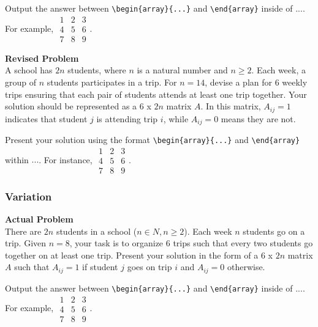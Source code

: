 Output the answer between \verb|\begin{array}{...}| and \verb|\end{array}| inside of $\boxed{...}$. For example, $\boxed{\begin{array}{ccc}1 & 2 & 3 \\ 4 & 5 & 6 \\ 7 & 8 & 9\end{array}}$.

\textbf{Revised Problem}\\
A school has $2n$ students, where $n$ is a natural number and $n \geq 2$. Each week, a group of $n$ students participates in a trip. For $n = 14$, devise a plan for 6 weekly trips ensuring that each pair of students attends at least one trip together. Your solution should be represented as a 6 x $2n$ matrix $A$. In this matrix, $A_{ij} = 1$ indicates that student $j$ is attending trip $i$, while $A_{ij} = 0$ means they are not.

Present your solution using the format \verb|\begin{array}{...}| and \verb|\end{array}| within $\boxed{...}$. For instance, $\boxed{\begin{array}{ccc}1 & 2 & 3 \\ 4 & 5 & 6 \\ 7 & 8 & 9\end{array}}$.

\subsubsection{Variation}
\textbf{Actual Problem}\\
There are $2n$ students in a school ($n \in N, n \geq 2$). Each week $n$ students go on a trip.
Given $n = 8$, your task is to organize 6 trips such that every two students go together on at least one trip. Present your solution 
in the form of a 6 x $2n$ matrix $A$ such that $A_{ij} = 1$ if student $j$ goes on trip $i$ and $A_{ij} = 0$ otherwise.

Output the answer between \verb|\begin{array}{...}| and \verb|\end{array}| inside of $\boxed{...}$. For example, $\boxed{\begin{array}{ccc}1 & 2 & 3 \\ 4 & 5 & 6 \\ 7 & 8 & 9\end{array}}$.

